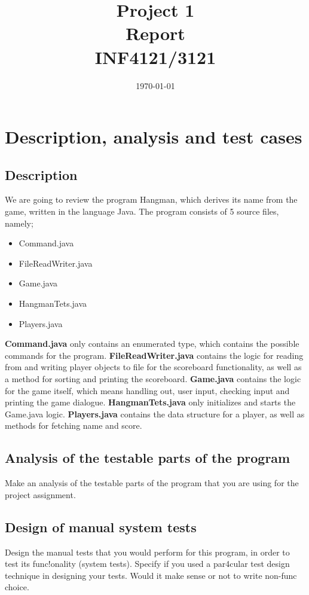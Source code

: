\documentclass{article}
\title{Project 1 \\ Report \\ INF4121/3121} %
\date{\today} %
\begin{document}
\maketitle %

\section{Description, analysis and test cases}

\subsection{Description}
We are going to review the program Hangman, which derives its name from the game, written in the language Java. The program consists of 5 source files, namely;
\begin{itemize}
\item Command.java
\item FileReadWriter.java
\item Game.java
\item HangmanTets.java
\item Players.java
\end{itemize}

\textbf{Command.java} only contains an enumerated type, which contains the possible commands for the program. \textbf{FileReadWriter.java} contains the logic for reading from and writing player objects to file for the scoreboard functionality, as well as a method for sorting and printing the scoreboard. \textbf{Game.java} contains the logic for the game itself, which means handling out, user input, checking input and printing the game dialogue. \textbf{HangmanTets.java} only initializes and starts the Game.java logic. \textbf{Players.java} contains the data structure for a player, as well as methods for fetching name and score.

\subsection{Analysis of the testable parts of the program}
Make an analysis of the testable parts of the program that you are using for the project assignment.

\subsection{Design of manual system tests}
Design the manual tests that you would perform for this program, in order to test its func!onality
(system tests). Specify if you used a par4cular test design technique in designing your tests.
Would it make sense or not to write non-func%
choice.
\end{document}
